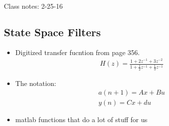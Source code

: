 Class notes: 2-25-16

\subsection*{State Space Filters}

\begin{itemize}
\item{
Digitized transfer fucntion from page 356.
\begin{align*}
H(z) = \frac{1 + 2z^{-1} + 3z^{-2}}{
1 + \frac{1}{2}z^{-1} + \frac{1}{3}z^{-1}}
\end{align*}
}
\item{
The notation:
\begin{align*}
a(n + 1) = Ax + Bu\\
y(n) = Cx + du
\end{align*}
}
\item{
matlab functions that do a lot of stuff for us
}
\end{itemize}

